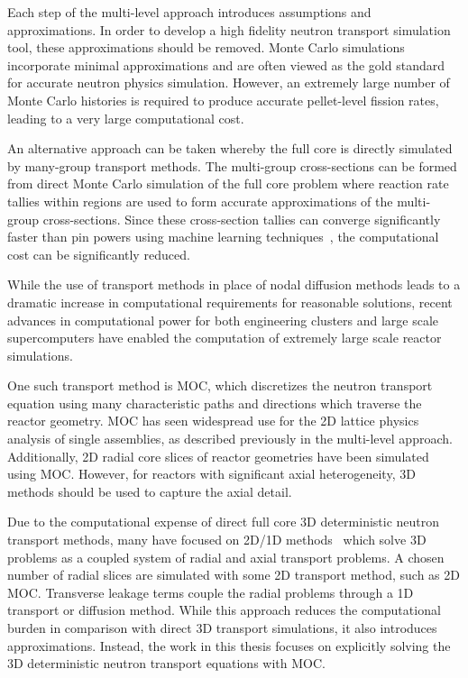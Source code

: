 Each step of the multi-level approach introduces assumptions and approximations. In order to develop a high fidelity neutron transport simulation tool, these approximations should be removed. Monte Carlo simulations incorporate minimal approximations and are often viewed as the gold standard for accurate neutron physics simulation. However, an extremely large number of Monte Carlo histories is required to produce accurate pellet-level fission rates, leading to a very large computational cost.

An alternative approach can be taken whereby the full core is directly simulated by many-group transport methods. The multi-group cross-sections can be formed from direct Monte Carlo simulation of the full core problem where reaction rate tallies within regions are used to form accurate approximations of the multi-group cross-sections. Since these cross-section tallies can converge significantly faster than pin powers using machine learning techniques~\cite{boyd2017thesis}, the computational cost can be significantly reduced. 

While the use of transport methods in place of nodal diffusion methods leads to a dramatic increase in computational requirements for reasonable solutions, recent advances in computational power for both engineering clusters and large scale supercomputers have enabled the computation of extremely large scale reactor simulations. 

One such transport method is \ac{MOC}, which discretizes the neutron transport equation using many characteristic paths and directions which traverse the reactor geometry. \ac{MOC} has seen widespread use for the 2D lattice physics analysis of single assemblies, as described previously in the multi-level approach. Additionally, 2D radial core slices of reactor geometries have been simulated using \ac{MOC}. However, for reactors with significant axial heterogeneity, 3D methods should be used to capture the axial detail. 

Due to the computational expense of direct full core 3D deterministic neutron transport methods, many have focused on 2D/1D methods~\cite{2d1d,liu2d1d, tang2d1d, collins2d1d, jarrett2d1d, wenbin2d1d} which solve 3D problems as a coupled system of radial and axial transport problems. A chosen number of radial slices are simulated with some 2D transport method, such as 2D \ac{MOC}. Transverse leakage terms couple the radial problems through a 1D transport or diffusion method. While this approach reduces the computational burden in comparison with direct 3D transport simulations, it also introduces approximations. Instead, the work in this thesis focuses on explicitly solving the 3D deterministic neutron transport equations with \ac{MOC}.

